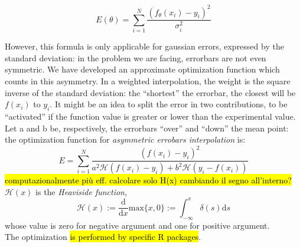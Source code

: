 $$
E(\theta)= \sum_{i=1}^{N} \frac{(f_{\theta}(x_i)-y_i)^2}{\sigma_{i}^2}
$$


However, this formula is only applicable for gaussian errors, expressed by the standard deviation: in the problem we are facing, errorbars are not even symmetric.
We have developed an approximate optimization function which counts in this asymmetry.
In a weighted interpolation, the weight is the square inverse of the standard deviation: the ``shortest'' the errorbar, the closest will be $f(x_i)$ to $y_i$.
It might be an idea to split the error in two contributions, to be ``activated'' if the function value is greater or lower than the experimental value.
Let a and b be, respectively, the errorbars ``over'' and ``down'' the mean point: the optimization function for \textit{asymmetric errobars interpolation} is:
$$ E= \sum_{i=1}^{N} \frac{(f(x_i)-y_i)^2}{a^{2}\mathcal{H}(f(x_i)-y_i)+b^{2}\mathcal{H}(y_i-f(x_i))} $$
\hl{computazionalmente pi\`u eff. calcolare solo H(x) cambiando il segno all'interno?}
$\mathcal{H}(x)$ is the \textit{Heaviside function},
$$\mathcal{H}(x):=\frac{\mathrm{d}}{\mathrm{d}x}\mathrm{max}\{x,0\}:=\int_{-\infty}^x \delta (s) \mathrm{d}s$$whose value is zero for negative argument and one for positive argument.\\
The optimization \hl{is performed by specific R packages}.
